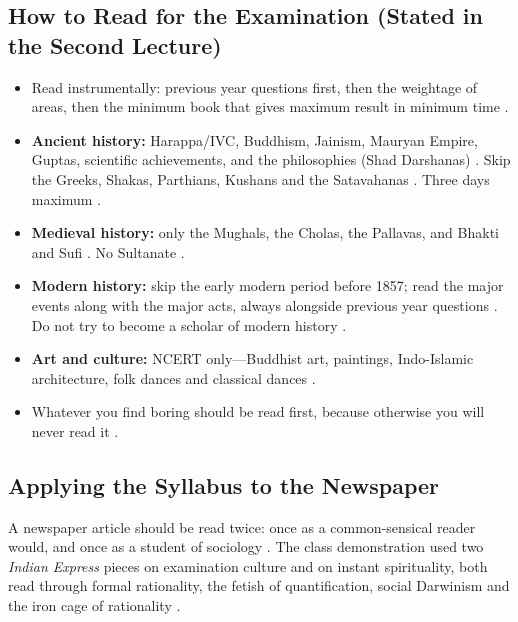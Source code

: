 \subsection{How to Read for the Examination (Stated in the Second Lecture)}
\begin{itemize}
    \item Read instrumentally: previous year questions first, then the weightage of areas, then the minimum book that gives maximum result in minimum time .
    \item \textbf{Ancient history:} Harappa/IVC, Buddhism, Jainism, Mauryan Empire, Guptas, scientific achievements, and the philosophies (Shad Darshanas) . Skip the Greeks, Shakas, Parthians, Kushans and the Satavahanas . Three days maximum .
    \item \textbf{Medieval history:} only the Mughals, the Cholas, the Pallavas, and Bhakti and Sufi . No Sultanate .
    \item \textbf{Modern history:} skip the early modern period before 1857; read the major events along with the major acts, always alongside previous year questions . Do not try to become a scholar of modern history .
    \item \textbf{Art and culture:} NCERT only---Buddhist art, paintings, Indo-Islamic architecture, folk dances and classical dances .
    \item Whatever you find boring should be read first, because otherwise you will never read it .
\end{itemize}

\subsection{Applying the Syllabus to the Newspaper}
A newspaper article should be read twice: once as a common-sensical reader would, and once as a student of sociology . The class demonstration used two \textit{Indian Express} pieces on examination culture and on instant spirituality, both read through formal rationality, the fetish of quantification, social Darwinism and the iron cage of rationality .